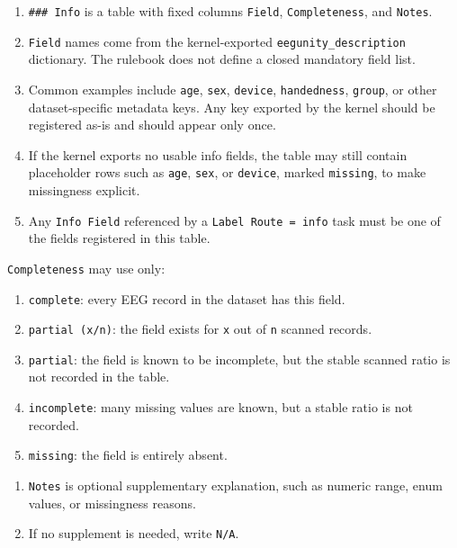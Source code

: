 \begin{tcolorbox}
\begin{enumerate}[leftmargin=1.5em,noitemsep,topsep=2pt]
\item \texttt{\#\#\# Info} is a table with fixed columns \texttt{Field}, \texttt{Completeness}, and \texttt{Notes}.
\item \texttt{Field} names come from the kernel-exported \texttt{eegunity\_description} dictionary. The rulebook does not define a closed mandatory field list.
\item Common examples include \texttt{age}, \texttt{sex}, \texttt{device}, \texttt{handedness}, \texttt{group}, or other dataset-specific metadata keys. Any key exported by the kernel should be registered as-is and should appear only once.
\item If the kernel exports no usable info fields, the table may still contain placeholder rows such as \texttt{age}, \texttt{sex}, or \texttt{device}, marked \texttt{missing}, to make missingness explicit.
\item Any \texttt{Info Field} referenced by a \texttt{Label Route = info} task must be one of the fields registered in this table.
\end{enumerate}

\smallskip{}\par\smallskip

\noindent \texttt{Completeness} may use only:\par\smallskip

\begin{enumerate}[leftmargin=1.5em,noitemsep,topsep=2pt]
\item \texttt{complete}: every EEG record in the dataset has this field.
\item \texttt{partial (x/n)}: the field exists for \texttt{x} out of \texttt{n} scanned records.
\item \texttt{partial}: the field is known to be incomplete, but the stable scanned ratio is not recorded in the table.
\item \texttt{incomplete}: many missing values are known, but a stable ratio is not recorded.
\item \texttt{missing}: the field is entirely absent.
\end{enumerate}

\smallskip{}\par\smallskip

\begin{enumerate}[leftmargin=1.5em,noitemsep,topsep=2pt]
\item \texttt{Notes} is optional supplementary explanation, such as numeric range, enum values, or missingness reasons.
\item If no supplement is needed, write \texttt{N/A}.
\end{enumerate}


\end{tcolorbox}
